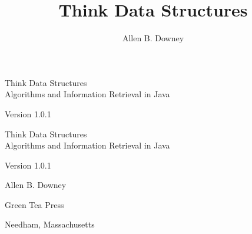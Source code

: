 \documentclass[12pt]{book}
\title{Think Data Structures}
\author{Allen B. Downey}
\newcommand{\thetitle}{Think Data Structures}
\newcommand{\thesubtitle}{Algorithms and Information Retrieval in Java}
\newcommand{\theauthors}{Allen B. Downey}
\newcommand{\theversion}{1.0.1}
\theoremstyle{exercise}
\newif\ifplastex
\begin{document}
\frontmatter

\ifplastex

\maketitle

\else

\begin{latexonly}

\thispagestyle{empty}

\begin{flushright}
\vspace*{2.0in}

\begin{spacing}{3}
{\huge \thetitle} \\
{\Large \thesubtitle}
\end{spacing}

\vspace{0.25in}

Version \theversion

\vfill
\end{flushright}

\newpage
\thispagestyle{empty}

\quad

\newpage
\thispagestyle{empty}

\begin{flushright}
\vspace*{2.0in}

\begin{spacing}{3}
{\huge \thetitle} \\
{\Large \thesubtitle}
\end{spacing}

\vspace{0.25in}

Version \theversion

\vspace{1in}

{\Large \theauthors}

\vspace{0.5in}

{\Large Green Tea Press}

{\small Needham, Massachusetts}

\vfill
\end{flushright}


\end{latexonly}
\end{document}
